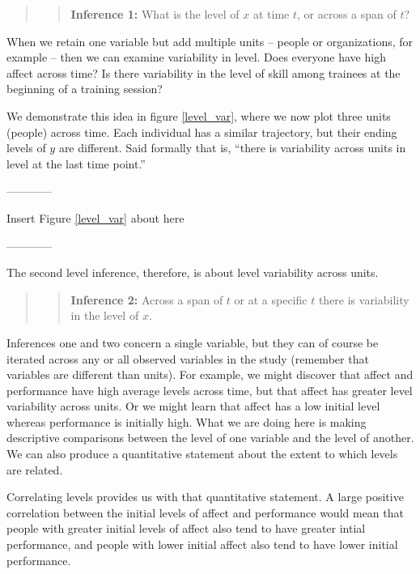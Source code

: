 \documentclass[english,,man]{apa6}
\theoremstyle{definition}
\theoremstyle{definition}
\theoremstyle{definition}
\theoremstyle{remark}
\begin{document}
\begin{quote}
\begin{quote}
\textbf{Inference 1:} What is the level of \(x\) at time \(t\), or
across a span of \(t\)?
\end{quote}
\end{quote}

When we retain one variable but add multiple units -- people or
organizations, for example -- then we can examine variability in level.
Does everyone have high affect across time? Is there variability in the
level of skill among trainees at the beginning of a training session?

We demonstrate this idea in figure \ref{level_var}, where we now plot
three units (people) across time. Each individual has a similar
trajectory, but their ending levels of \(y\) are different. Said
formally that is, \enquote{there is variability across units in level at
the last time point.}

\begin{center}

------------

Insert Figure \ref{level_var} about here

------------

\end{center}

\noindent The second level inference, therefore, is about level
variability across units.

\begin{quote}
\begin{quote}
\textbf{Inference 2:} Across a span of \(t\) or at a specific \(t\)
there is variability in the level of \(x\).
\end{quote}
\end{quote}

Inferences one and two concern a single variable, but they can of course
be iterated across any or all observed variables in the study (remember
that variables are different than units). For example, we might discover
that affect and performance have high average levels across time, but
that affect has greater level variability across units. Or we might
learn that affect has a low initial level whereas performance is
initially high. What we are doing here is making descriptive comparisons
between the level of one variable and the level of another. We can also
produce a quantitative statement about the extent to which levels are
related.

Correlating levels provides us with that quantitative statement. A large
positive correlation between the initial levels of affect and
performance would mean that people with greater initial levels of affect
also tend to have greater intial performance, and people with lower
initial affect also tend to have lower initial performance.
\end{document}
